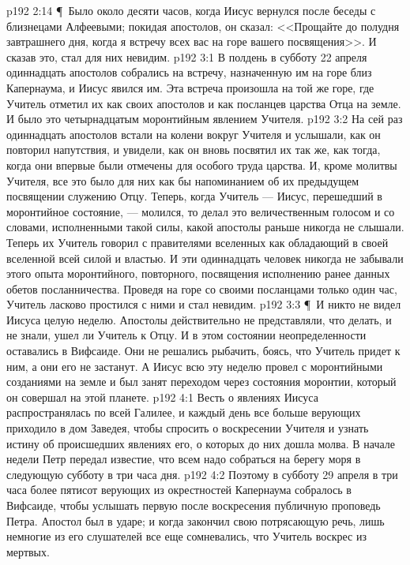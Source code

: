 \vs p192 2:14 \P\ Было около десяти часов, когда Иисус вернулся после беседы с близнецами Алфеевыми; покидая апостолов, он сказал: <<Прощайте до полудня завтрашнего дня, когда я встречу всех вас на горе вашего посвящения>>. И сказав это, стал для них невидим.
\vs p192 3:1 В полдень в субботу 22 апреля одиннадцать апостолов собрались на встречу, назначенную им на горе близ Капернаума, и Иисус явился им. Эта встреча произошла на той же горе, где Учитель отметил их как своих апостолов и как посланцев царства Отца на земле. И было это четырнадцатым моронтийным явлением Учителя.
\vs p192 3:2 На сей раз одиннадцать апостолов встали на колени вокруг Учителя и услышали, как он повторил напутствия, и увидели, как он вновь посвятил их так же, как тогда, когда они впервые были отмечены для особого труда царства. И, кроме молитвы Учителя, все это было для них как бы напоминанием об их предыдущем посвящении служению Отцу. Теперь, когда Учитель --- Иисус, перешедший в моронтийное состояние, --- молился, то делал это величественным голосом и со словами, исполненными такой силы, какой апостолы раньше никогда не слышали. Теперь их Учитель говорил с правителями вселенных как обладающий в своей вселенной всей силой и властью. И эти одиннадцать человек никогда не забывали этого опыта моронтийного, повторного, посвящения исполнению ранее данных обетов посланничества. Проведя на горе со своими посланцами только один час, Учитель ласково простился с ними и стал невидим.
\vs p192 3:3 \P\ И никто не видел Иисуса целую неделю. Апостолы действительно не представляли, что делать, и не знали, ушел ли Учитель к Отцу. И в этом состоянии неопределенности оставались в Вифсаиде. Они не решались рыбачить, боясь, что Учитель придет к ним, а они его не застанут. А Иисус всю эту неделю провел с моронтийными созданиями на земле и был занят переходом через состояния моронтии, который он совершал на этой планете.
\vs p192 4:1 Весть о явлениях Иисуса распространялась по всей Галилее, и каждый день все больше верующих приходило в дом Заведея, чтобы спросить о воскресении Учителя и узнать истину об происшедших явлениях его, о которых до них дошла молва. В начале недели Петр передал известие, что всем надо собраться на берегу моря в следующую субботу в три часа дня.
\vs p192 4:2 Поэтому в субботу 29 апреля в три часа более пятисот верующих из окрестностей Капернаума собралось в Вифсаиде, чтобы услышать первую после воскресения публичную проповедь Петра. Апостол был в ударе; и когда закончил свою потрясающую речь, лишь немногие из его слушателей все еще сомневались, что Учитель воскрес из мертвых.
